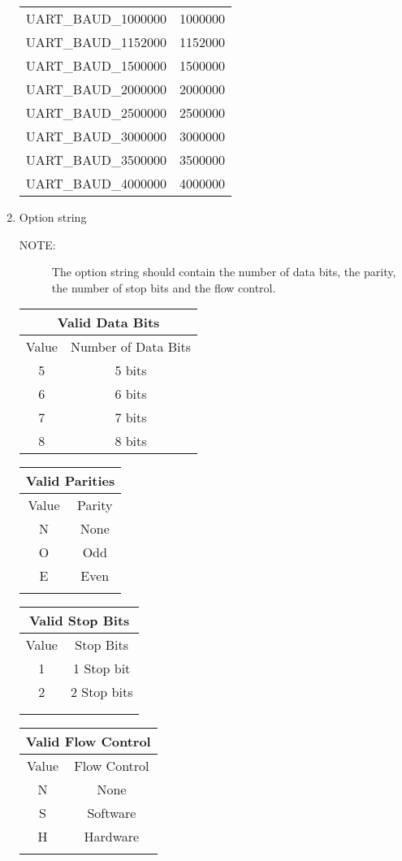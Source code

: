 \documentclass{report}
\begin{document}
\begin{enumerate}
\begin{tabular}{| c | c |}
UART\_BAUD\_1000000 & 1000000 \\
UART\_BAUD\_1152000 & 1152000 \\
UART\_BAUD\_1500000 & 1500000 \\
UART\_BAUD\_2000000 & 2000000 \\
UART\_BAUD\_2500000 & 2500000 \\
UART\_BAUD\_3000000 & 3000000 \\
UART\_BAUD\_3500000 & 3500000 \\
UART\_BAUD\_4000000 & 4000000 \\
\hline
\end{tabular}
\item Option string
\begin{description}
\item[NOTE:] The option string should contain the number of data bits,
the parity, the number of stop bits and the flow control.
\end{description}
\begin{tabular}{| c | c |}
\hline
\multicolumn{2}{|c|}{Valid Data Bits} \\
\hline
Value & Number of Data Bits \\
\hline
5 & 5 bits \\
6 & 6 bits \\
7 & 7 bits \\
8 & 8 bits \\
\hline
\end{tabular}
\begin{tabular}{| c | c |}
\hline
\multicolumn{2}{|c|}{Valid Parities} \\
\hline
Value & Parity \\
\hline
N & None \\
O & Odd \\
E & Even \\
& \\
\hline
\end{tabular}
\begin{tabular}{| c | c |}
\hline
\multicolumn{2}{|c|}{Valid Stop Bits} \\
\hline
Value & Stop Bits \\
\hline
1 & 1 Stop bit \\
2 & 2 Stop bits \\
& \\
& \\
\hline
\end{tabular}
\begin{tabular}{| c | c |}
\hline
\multicolumn{2}{|c|}{Valid Flow Control} \\
\hline
Value & Flow Control \\
\hline
N & None \\
S & Software \\
H & Hardware \\
& \\
\hline
\end{tabular}
\end{enumerate}
\end{document}
